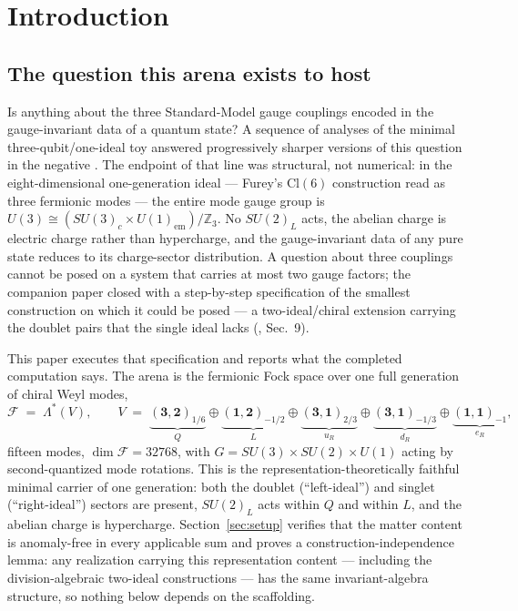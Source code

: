 \documentclass[11pt]{article}
\newcommand{\ZZ}{\mathbb{Z}}
\newcommand{\Fock}{\mathcal{F}}
\newcommand{\rep}[2]{(\mathbf{#1})_{#2}}
\begin{document}
\section{Introduction}

\subsection{The question this arena exists to host}

Is anything about the three Standard-Model gauge couplings encoded in the gauge-invariant data of a quantum state? A sequence of analyses of the minimal three-qubit/one-ideal toy answered progressively sharper versions of this question in the negative \cite{p1,p2}. The endpoint of that line was structural, not numerical: in the eight-dimensional one-generation ideal --- Furey's $\mathrm{Cl}(6)$ construction \cite{furey14,furey18,stoica} read as three fermionic modes \cite{szangolies} --- the entire mode gauge group is $U(3)\cong (SU(3)_c\times U(1)_{\mathrm{em}})/\ZZ_3$. No $SU(2)_L$ acts, the abelian charge is electric charge rather than hypercharge, and the gauge-invariant data of any pure state reduces to its charge-sector distribution. A question about three couplings cannot be posed on a system that carries at most two gauge factors; the companion paper closed with a step-by-step specification of the smallest construction on which it could be posed --- a two-ideal/chiral extension carrying the doublet pairs that the single ideal lacks (\cite{p2}, Sec.~9).

This paper executes that specification and reports what the completed computation says. The arena is the fermionic Fock space over one full generation of chiral Weyl modes,
\begin{equation*}
\Fock \;=\; \Lambda^{*}(V), \qquad V \;=\; \underbrace{\rep{3,2}{1/6}}_{Q} \oplus \underbrace{\rep{1,2}{-1/2}}_{L} \oplus \underbrace{\rep{3,1}{2/3}}_{u_R} \oplus \underbrace{\rep{3,1}{-1/3}}_{d_R} \oplus \underbrace{\rep{1,1}{-1}}_{e_R},
\end{equation*}
fifteen modes, $\dim\Fock = 32768$, with $G = SU(3)\times SU(2)\times U(1)$ acting by second-quantized mode rotations. This is the representation-theoretically faithful minimal carrier of one generation: both the doublet (``left-ideal'') and singlet (``right-ideal'') sectors are present, $SU(2)_L$ acts within $Q$ and within $L$, and the abelian charge is hypercharge. Section~\ref{sec:setup} verifies that the matter content is anomaly-free in every applicable sum and proves a construction-independence lemma: any realization carrying this representation content --- including the division-algebraic two-ideal constructions \cite{furey14,furey16,furey18} --- has the same invariant-algebra structure, so nothing below depends on the scaffolding.
\end{document}
